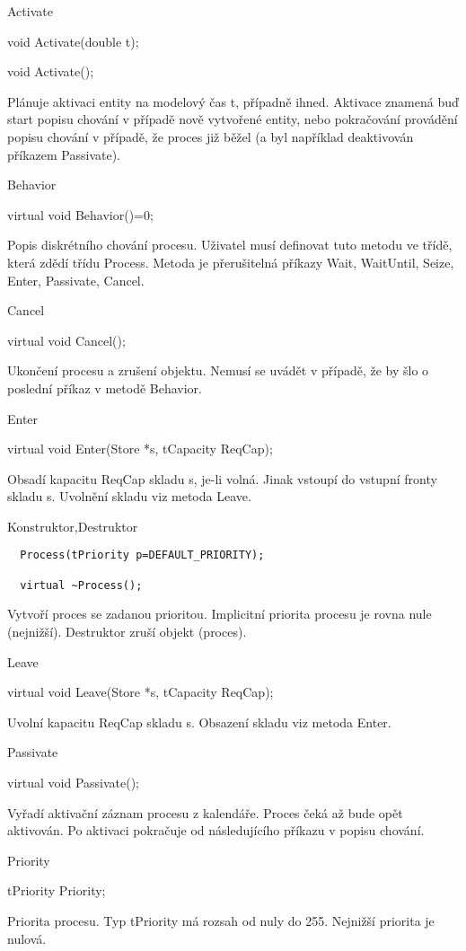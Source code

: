 \documentclass[a4paper]{article}
\begin{document}
Activate

  void Activate(double t);

  void Activate();


Plánuje aktivaci entity na modelový čas t, případně ihned.
Aktivace znamená buď start popisu chování v případě nově vytvořené
entity, nebo pokračování provádění popisu chování v případě, že proces
již běžel (a byl například deaktivován příkazem Passivate).


Behavior

  virtual void Behavior()=0;


Popis diskrétního chování procesu. Uživatel musí definovat tuto metodu
ve třídě, která zdědí třídu Process. Metoda je přerušitelná
příkazy Wait, WaitUntil, Seize, Enter,
Passivate, Cancel.


Cancel

  virtual void Cancel();


Ukončení procesu a zrušení objektu. Nemusí se uvádět v případě, že
by šlo o poslední příkaz v metodě Behavior.


Enter

  virtual void Enter(Store *s, tCapacity ReqCap);


Obsadí kapacitu ReqCap skladu s, je-li volná. Jinak
vstoupí do vstupní fronty skladu s. Uvolnění skladu viz metoda Leave.


Konstruktor,Destruktor

\begin{verbatim}
  Process(tPriority p=DEFAULT_PRIORITY);

  virtual ~Process();
\end{verbatim}

Vytvoří proces se zadanou prioritou. Implicitní priorita procesu
je rovna nule (nejnižší). Destruktor zruší objekt (proces).


Leave

  virtual void Leave(Store *s, tCapacity ReqCap);


Uvolní kapacitu ReqCap skladu s. Obsazení skladu
viz metoda Enter.


Passivate

  virtual void Passivate();


Vyřadí aktivační záznam procesu z kalendáře. Proces čeká až bude
opět aktivován. Po aktivaci pokračuje od následujícího příkazu v
popisu chování.


Priority

  tPriority Priority;


Priorita procesu. Typ tPriority má rozsah od nuly do 255.
Nejnižší priorita je nulová.
\end{document}
